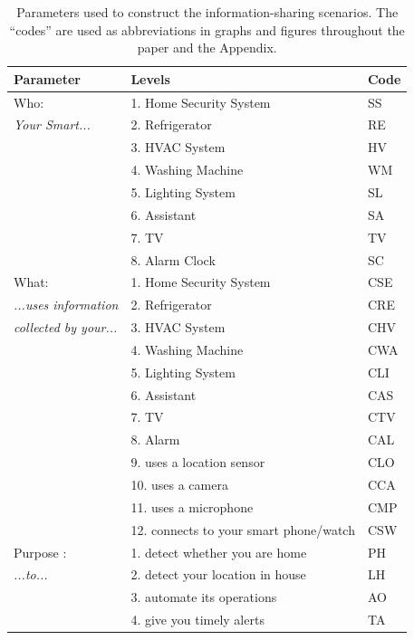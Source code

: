 \begin{table}
	\centering
	\caption{Parameters used to construct the information-sharing scenarios. The ``codes'' are used as abbreviations in graphs and figures throughout the paper and the Appendix.}
	\label{tab:parameter}
	\begin{tabular} {l|l|l}
		\hline
		\textbf{Parameter} & \textbf{Levels} & \textbf{Code} 	 \\ \hline
		Who:  & 1. Home Security System & SS\\ 		
		\emph{Your Smart...}	& 2. Refrigerator & RE							 \\
		& 3. HVAC System							& HV	 \\
		& 4. Washing Machine						& WM		 \\
		& 5. Lighting System						& SL	 \\
		& 6. Assistant 							 &SA\\
		& 7. TV 							 &TV\\
		& 8. Alarm Clock							&SC \\ \hline
		What:  & 1. Home Security System & CSE\\
		\emph{...uses information } & 2. Refrigerator &CRE							 \\
		\emph{collected by your...} & 3. HVAC System &CHV								 \\
		& 4. Washing Machine						& CWA		 \\
		& 5. Lighting System						&CLI	 \\
		& 6. Assistant 							 & CAS\\
		& 7. TV 							 & CTV\\
		& 8. Alarm							 & CAL\\
		& 9. uses a location sensor			&CLO	\\	
		& 10. uses a camera				& CCA\\	
		& 11. uses a microphone			& CMP				\\	
		& 12. connects to your smart phone/watch &CSW				\\\hline
		Purpose : & 1. detect whether you are home & PH		\\
		\emph{...to...} & 2. detect your location in house &LH		\\				
		& 3. automate its operations &AO\\
		& 4. give you timely alerts & TA\\ \hline

\end{tabular}
\end{table}
